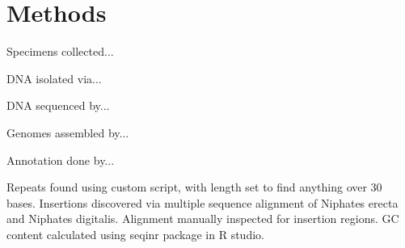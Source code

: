 \documentclass[../main.tex]{subfiles}
\begin{document}
\section{Methods}

Specimens collected...

DNA isolated via...

DNA sequenced by...

Genomes assembled by...

Annotation done by...

Repeats found using custom script, with length set to find anything over 30 bases. Insertions discovered via multiple sequence alignment of Niphates erecta and Niphates digitalis. Alignment manually inspected for insertion regions. GC content calculated using seqinr package in R studio. 
\end{document}
